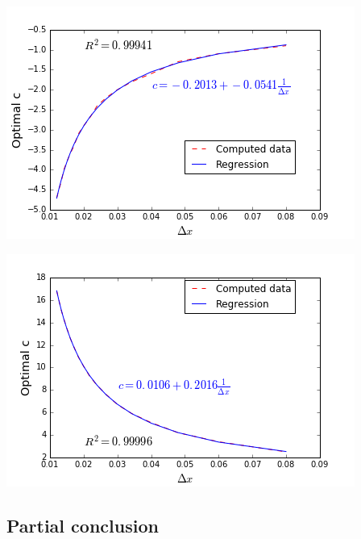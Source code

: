 \begin{minipage}{.5\linewidth}
\begin{center}
	\includegraphics[scale=.5]{figures/FinalFigures/regressionDxFinalVersionMarshalN.png}
\end{center}
\end{minipage}
\begin{minipage}{.5\linewidth}
\begin{center}
	\includegraphics[scale=.5]{figures/FinalFigures/regressionDxFinalVersionMarshalP.png}
\end{center}
\end{minipage}

\subsection{Partial conclusion}
 
